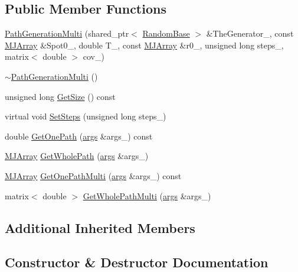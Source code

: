 \subsection*{Public Member Functions}
\begin{DoxyCompactItemize}
\item 
\hyperlink{classPathGenerationMulti_aa843f97fa46491f3ab826dd3914530d9}{Path\+Generation\+Multi} (shared\+\_\+ptr$<$ \hyperlink{classRandomBase}{Random\+Base} $>$ \&The\+Generator\+\_\+, const \hyperlink{classMJArray}{M\+J\+Array} \&Spot0\+\_\+, double T\+\_\+, const \hyperlink{classMJArray}{M\+J\+Array} \&r0\+\_\+, unsigned long steps\+\_\+, matrix$<$ double $>$ cov\+\_\+)
\item 
\hyperlink{classPathGenerationMulti_a270bb66f379b62d5af8f8d4e218127f0}{$\sim$\+Path\+Generation\+Multi} ()
\item 
unsigned long \hyperlink{classPathGenerationMulti_ad5e790a4a0555472307292bdcddafe8c}{Get\+Size} () const
\item 
virtual void \hyperlink{classPathGenerationMulti_ac650e3d724dc4cf3443305b8d1f48a4d}{Set\+Steps} (unsigned long steps\+\_\+)
\item 
double \hyperlink{classPathGenerationMulti_aca9ffcbef7f0ae7e00177104b97abbf1}{Get\+One\+Path} (\hyperlink{path__generation_8h_a75c13cde2074f502cc4348c70528572d}{args} \&args\+\_\+) const
\item 
\hyperlink{classMJArray}{M\+J\+Array} \hyperlink{classPathGenerationMulti_ab47e41a3cc266a81ac1770868b5ac7ca}{Get\+Whole\+Path} (\hyperlink{path__generation_8h_a75c13cde2074f502cc4348c70528572d}{args} \&args\+\_\+)
\item 
\hyperlink{classMJArray}{M\+J\+Array} \hyperlink{classPathGenerationMulti_aeae71235d01a98759c1d075694e8096e}{Get\+One\+Path\+Multi} (\hyperlink{path__generation_8h_a75c13cde2074f502cc4348c70528572d}{args} \&args\+\_\+) const
\item 
matrix$<$ double $>$ \hyperlink{classPathGenerationMulti_af2e36af2e3347fd0ae71775c7133c5c9}{Get\+Whole\+Path\+Multi} (\hyperlink{path__generation_8h_a75c13cde2074f502cc4348c70528572d}{args} \&args\+\_\+)
\end{DoxyCompactItemize}
\subsection*{Additional Inherited Members}


\subsection{Constructor \& Destructor Documentation}
\hypertarget{classPathGenerationMulti_aa843f97fa46491f3ab826dd3914530d9}{}\label{classPathGenerationMulti_aa843f97fa46491f3ab826dd3914530d9} 
